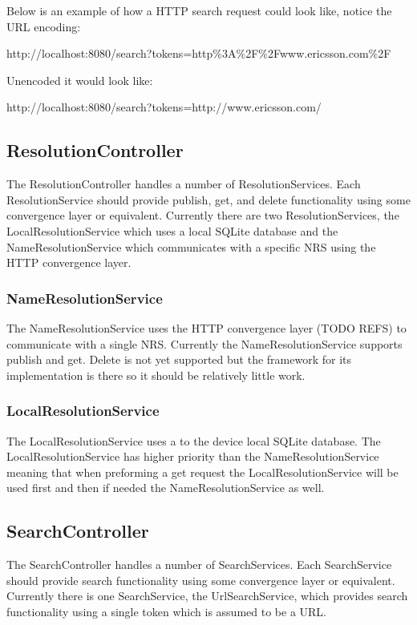 Below is an example of how a HTTP search request could look like, notice the URL encoding:

http://localhost:8080/search?tokens=http\%3A\%2F\%2Fwww.ericsson.com\%2F

Unencoded it would look like:

http://localhost:8080/search?tokens=http://www.ericsson.com/

\subsection{ResolutionController}
\label{sec:ResolutionController}

The ResolutionController handles a number of ResolutionServices. Each ResolutionService should provide publish, get, and delete functionality using some convergence layer or equivalent. Currently there are two ResolutionServices, the LocalResolutionService which uses a local SQLite database and the NameResolutionService which communicates with a specific NRS using the HTTP convergence layer.

\subsubsection{NameResolutionService}

The NameResolutionService uses the HTTP convergence layer (TODO REFS) to communicate with a single NRS. Currently the NameResolutionService supports publish and get. Delete is not yet supported but the framework for its implementation is there so it should be relatively little work.

\subsubsection{LocalResolutionService}

The LocalResolutionService uses a to the device local SQLite database. The LocalResolutionService has higher priority than the NameResolutionService meaning that when preforming a get request the LocalResolutionService will be used first and then if needed the NameResolutionService as well.

\subsection{SearchController}
\label{sec:SearchController}

The SearchController handles a number of SearchServices. Each SearchService should provide search functionality using some convergence layer or equivalent. Currently there is one SearchService, the UrlSearchService, which provides search functionality using a single token which is assumed to be a URL.

